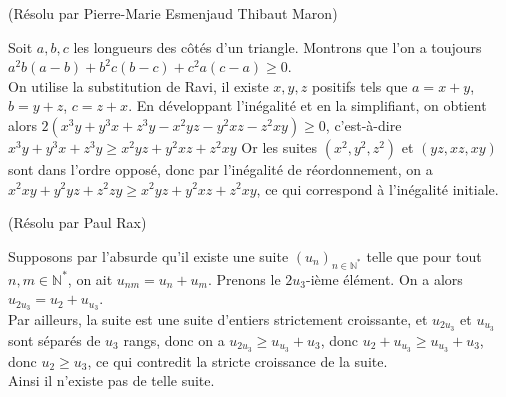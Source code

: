 \begin{sol}[130](Résolu par Pierre-Marie Esmenjaud Thibaut Maron)

Soit $a,b,c$ les longueurs des côtés d'un triangle. Montrons que l'on a toujours $a^2b(a-b)+b^2c(b-c)+c^2a(c-a) \geq 0$.\\
On utilise la substitution de Ravi, il existe $x,y,z$ positifs tels que 
$a=x+y$,$b=y+z$, $c=z+x$.
En développant l'inégalité et en la simplifiant, on obtient alors
$2(x^3y+y^3x+z^3y-x^2yz-y^2xz-z^2xy) \geq 0$,
c'est-\`a-dire $x^3y+y^3x+z^3y \geq x^2yz+y^2xz+z^2xy$
Or les suites $(x^2,y^2,z^2)$ et $(yz,xz,xy)$ sont dans l'ordre opposé, donc par l'in\'egalit\'e de r\'eordonnement,
on a $x^2xy+y^2yz+z^2zy \geq x^2yz+y^2xz+z^2xy$, ce qui correspond \`a l'in\'egalit\'e initiale.

\end{sol}

\begin{sol}[130](Résolu par Paul Rax)

Supposons par l'absurde qu'il existe une suite $(u_n)_{n \in \mathbb{N}^*}$ telle que pour tout $n,m \in \mathbb{N}^*$, on ait
$u_{nm}=u_n+u_m$. Prenons le $2u_3$-i\`eme \'el\'ement. On a alors $u_{2u_3}=u_2+u_{u_3}$.\\
Par ailleurs, la suite est une suite d'entiers strictement croissante, et $u_{2u_3}$ et $u_{u_3}$ sont s\'epar\'es de $u_3$ rangs,
donc on a $u_{2u_3} \geq u_{u_3} +u_3$, donc $u_2+u_{u_3} \geq u_{u_3} +u_3$, donc $u_2 \geq u_3$, ce qui contredit la stricte croissance de la suite.\\
Ainsi il n'existe pas de telle suite.

\end{sol}



